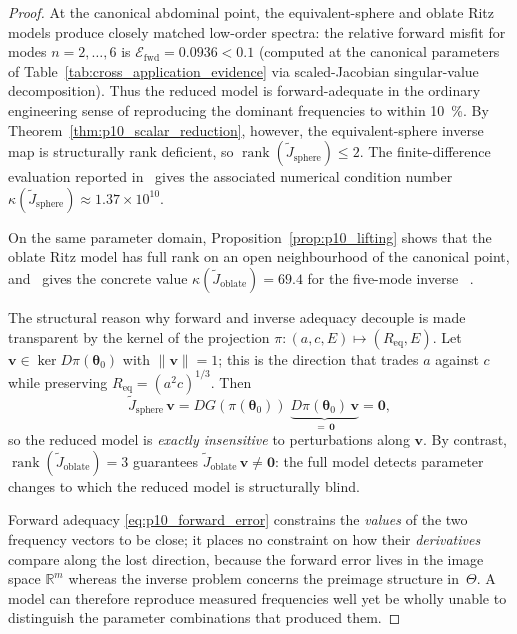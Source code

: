 \begin{proof}
At the canonical abdominal point, the equivalent-sphere and oblate Ritz models
produce closely matched low-order spectra: the relative forward misfit for modes
$n=2,\ldots,6$ is $\mathcal{E}_\mathrm{fwd}=0.0936<0.1$ (computed at the
canonical parameters of Table~\ref{tab:cross_application_evidence} via scaled-Jacobian
singular-value decomposition).  Thus the reduced
model is forward-adequate in the ordinary engineering sense of reproducing the
dominant frequencies to within \SI{10}{\percent}.  By
Theorem~\ref{thm:p10_scalar_reduction}, however, the equivalent-sphere inverse
map is structurally rank deficient, so
$\operatorname{rank}(\widetilde{J}_\mathrm{sphere})\leq 2$.  The finite-difference
evaluation reported in~\cite{BrowntoneP8} gives the associated numerical condition number
$\kappa(\widetilde{J}_\mathrm{sphere})\approx 1.37\times10^{10}$.

On the same parameter domain, Proposition~\ref{prop:p10_lifting} shows that the
oblate Ritz model has full rank on an open neighbourhood of the canonical
point, and~\cite{BrowntoneP8} gives the concrete value
$\kappa(\widetilde{J}_\mathrm{oblate})=69.4$ for the five-mode inverse
~\cite{BrowntoneP8}.

The structural reason why forward and inverse adequacy decouple is made
transparent by the kernel of the projection
$\pi:(a,c,E)\mapsto(R_\mathrm{eq},E)$.  Let
$\mathbf{v}\in\ker D\pi(\boldsymbol{\theta}_0)$ with $\|\mathbf{v}\|=1$; this
is the direction that trades $a$ against $c$ while preserving
$R_\mathrm{eq}=(a^2 c)^{1/3}$.  Then
\begin{equation}
  \widetilde{J}_\mathrm{sphere}\,\mathbf{v}
  =
  DG(\pi(\boldsymbol{\theta}_0))\;
  \underbrace{D\pi(\boldsymbol{\theta}_0)\,\mathbf{v}}_{=\,\mathbf{0}}
  =
  \mathbf{0},
  \label{eq:p10_kernel_mechanism}
\end{equation}
so the reduced model is \emph{exactly insensitive} to perturbations along
$\mathbf{v}$.  By contrast, $\operatorname{rank}(\widetilde{J}_\mathrm{oblate})=3$
guarantees $\widetilde{J}_\mathrm{oblate}\,\mathbf{v}\neq\mathbf{0}$: the
full model detects parameter changes to which the reduced model is structurally
blind.

Forward adequacy \eqref{eq:p10_forward_error} constrains the \emph{values} of
the two frequency vectors to be close; it places no constraint on how their
\emph{derivatives} compare along the lost direction, because the forward error
lives in the image space $\mathbb{R}^m$ whereas the inverse problem concerns
the preimage structure in~$\Theta$.  A model can therefore reproduce measured
frequencies well yet be wholly unable to distinguish the parameter
combinations that produced them.
\end{proof}

